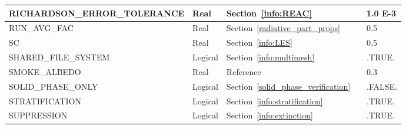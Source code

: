 \documentclass[11pt]{book}
\begin{document}
\begin{longtable}{@{\extracolsep{\fill}}|l|l|l|l|l|}
{\ct RICHARDSON\_ERROR\_TOLERANCE}              & Real          & Section~\ref{info:REAC}                               &               & 1.0 E-3           \\ \hline
{\ct RUN\_AVG\_FAC}                             & Real          & Section~\ref{radiative_part_props}                    &               & 0.5               \\ \hline
{\ct SC}                                        & Real          & Section~\ref{info:LES}                                &               & 0.5               \\ \hline
{\ct SHARED\_FILE\_SYSTEM}                      & Logical       & Section~\ref{info:multimesh}                          &               & {\ct .TRUE.}      \\ \hline
{\ct SMOKE\_ALBEDO}                             & Real          & Reference~\cite{Smokeview_Users_Guide}                &               & 0.3               \\ \hline
{\ct SOLID\_PHASE\_ONLY}                        & Logical       & Section~\ref{solid_phase_verification}                &               & {\ct .FALSE.}     \\ \hline
{\ct STRATIFICATION}                            & Logical       & Section~\ref{info:stratification}                     &               & {\ct .TRUE.}      \\ \hline
{\ct SUPPRESSION}                               & Logical       & Section~\ref{info:extinction}                         &                   & {\ct .TRUE.}      \\ \hline

\end{longtable}
\end{document}
